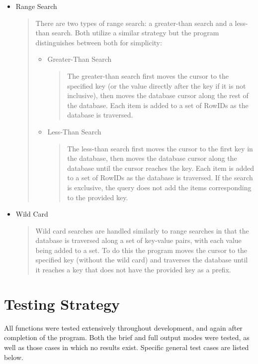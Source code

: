 \documentclass[11pt, a4paper]{article}
\begin{document}
{\begin{itemize}
\item Range Search
	\begin{quotation}
	\noindent There are two types of range search: a greater-than search and a less-than search. Both utilize a similar strategy but the program distinguishes between both for simplicity:
	\begin{itemize}
		\item Greater-Than Search
		\begin{quotation}
		\noindent The greater-than search first moves the cursor to the specified key (or the value directly after the key if it is not inclusive), then moves the database cursor along the rest of the database. Each item is added to a set of RowIDs as the database is traversed.
		\end{quotation}
		\item Less-Than Search
		\begin{quotation}
		\noindent The less-than search first moves the cursor to the first key in the database, then moves the database cursor along the database until the cursor reaches the key. Each item is added to a set of RowIDs as the database is traversed. If the search is exclusive, the query does not add the items corresponding to the provided key.
		\end{quotation}
	\end{itemize}
	\end{quotation}

\item Wild Card
	\begin{quotation}
	\noindent Wild card searches are handled similarly to range searches in that the database is traversed along a set of key-value pairs, with each value being added to a set. To do this the program moves the cursor to the specified key (without the wild card) and traverses the database until it reaches a key that does not have the provided key as a prefix. 
	\end{quotation}	
\end{itemize}


\section{Testing Strategy}\label{TS}
All functions were tested extensively throughout development, and again after completion of the program. Both the brief and full output modes were tested, as well as those cases in which no results exist. Specific general test cases are listed below.
\begin{itemize}


\end{itemize}}
\end{document}
